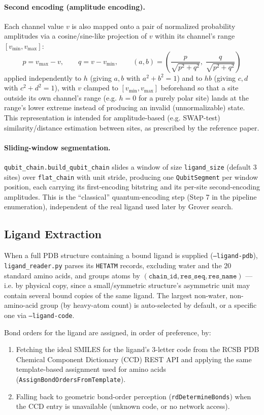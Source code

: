 \documentclass[11pt,a4paper]{article}
\begin{document}
\paragraph{Second encoding (amplitude encoding).} Each channel value $v$ is also mapped onto a pair of normalized probability amplitudes via a cosine/sine-like projection of $v$ within its channel's range $[v_{\min}, v_{\max}]$:
\[
p = v_{\max} - v, \qquad q = v - v_{\min}, \qquad
(a, b) = \left( \frac{p}{\sqrt{p^2+q^2}}, \; \frac{q}{\sqrt{p^2+q^2}} \right)
\]
applied independently to $h$ (giving $a,b$ with $a^2+b^2=1$) and to $hb$ (giving $c,d$ with $c^2+d^2=1$), with $v$ clamped to $[v_{\min}, v_{\max}]$ beforehand so that a site outside its own channel's range (e.g. $h=0$ for a purely polar site) lands at the range's lower extreme instead of producing an invalid (unnormalizable) state. This representation is intended for amplitude-based (e.g. SWAP-test) similarity/distance estimation between sites, as prescribed by the reference paper.

\paragraph{Sliding-window segmentation.} \texttt{qubit\_chain.build\_qubit\_chain} slides a window of size \texttt{ligand\_size} (default 3 sites) over \texttt{flat\_chain} with unit stride, producing one \texttt{QubitSegment} per window position, each carrying its first-encoding bitstring and its per-site second-encoding amplitudes. This is the ``classical'' quantum-encoding step (Step 7 in the pipeline enumeration), independent of the real ligand used later by Grover search.

\subsection{Ligand Extraction}
\label{sec:ligand-extraction}

When a full PDB structure containing a bound ligand is supplied (\texttt{--ligand-pdb}), \texttt{ligand\_reader.py} parses its \texttt{HETATM} records, excluding water and the 20 standard amino acids, and groups atoms by $(\texttt{chain\_id}, \texttt{res\_seq}, \texttt{res\_name})$ — i.e. by physical copy, since a small/symmetric structure's asymmetric unit may contain several bound copies of the same ligand. The largest non-water, non-amino-acid group (by heavy-atom count) is auto-selected by default, or a specific one via \texttt{--ligand-code}.

Bond orders for the ligand are assigned, in order of preference, by:
\begin{enumerate}[leftmargin=1.8em]
    \item Fetching the ideal SMILES for the ligand's 3-letter code from the RCSB PDB Chemical Component Dictionary (CCD) REST API and applying the same template-based assignment used for amino acids (\texttt{AssignBondOrdersFromTemplate}).
    \item Falling back to geometric bond-order perception (\texttt{rdDetermineBonds}) when the CCD entry is unavailable (unknown code, or no network access).
\end{enumerate}
\end{document}
